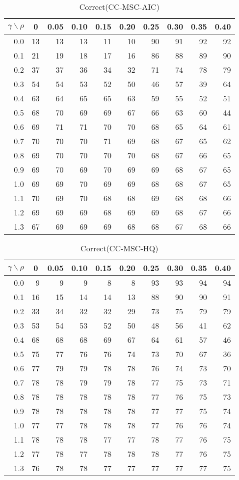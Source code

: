 \documentclass[12pt]{article}
\begin{document}
%
\begin{table}[!tbp]
\caption{Correct(CC-MSC-AIC)}
 \begin{center}
 \begin{tabular}{r|rrrrrrrrr}\hline\hline
\multicolumn{1}{c|}{$\gamma\backslash\rho$}&\multicolumn{1}{c}{0}&\multicolumn{1}{c}{0.05}&\multicolumn{1}{c}{0.10}&\multicolumn{1}{c}{0.15}&\multicolumn{1}{c}{0.20}&\multicolumn{1}{c}{0.25}&\multicolumn{1}{c}{0.30}&\multicolumn{1}{c}{0.35}&\multicolumn{1}{c}{0.40}\tabularnewline
\hline
0.0&13&13&13&11&10&90&91&92&92\tabularnewline
0.1&21&19&18&17&16&86&88&89&90\tabularnewline
0.2&37&37&36&34&32&71&74&78&79\tabularnewline
0.3&54&54&53&52&50&46&57&39&64\tabularnewline
0.4&63&64&65&65&63&59&55&52&51\tabularnewline
0.5&68&70&69&69&67&66&63&60&44\tabularnewline
0.6&69&71&71&70&70&68&65&64&61\tabularnewline
0.7&70&70&70&71&69&68&67&65&62\tabularnewline
0.8&69&70&70&70&70&68&67&66&65\tabularnewline
0.9&69&70&69&70&69&69&68&67&65\tabularnewline
1.0&69&69&70&69&69&68&68&67&65\tabularnewline
1.1&70&69&70&68&68&69&68&68&66\tabularnewline
1.2&69&69&69&68&69&69&68&67&66\tabularnewline
1.3&67&69&69&69&68&68&67&68&66\tabularnewline
\hline
\end{tabular}

\end{center}

\end{table}

%
\begin{table}[!tbp]
\caption{Correct(CC-MSC-HQ)}
 \begin{center}
 \begin{tabular}{r|rrrrrrrrr}\hline\hline
\multicolumn{1}{c|}{$\gamma\backslash\rho$}&\multicolumn{1}{c}{0}&\multicolumn{1}{c}{0.05}&\multicolumn{1}{c}{0.10}&\multicolumn{1}{c}{0.15}&\multicolumn{1}{c}{0.20}&\multicolumn{1}{c}{0.25}&\multicolumn{1}{c}{0.30}&\multicolumn{1}{c}{0.35}&\multicolumn{1}{c}{0.40}\tabularnewline
\hline
0.0& 9& 9& 9& 8& 8&93&93&94&94\tabularnewline
0.1&16&15&14&14&13&88&90&90&91\tabularnewline
0.2&33&34&32&32&29&73&75&79&79\tabularnewline
0.3&53&54&53&52&50&48&56&41&62\tabularnewline
0.4&68&68&68&69&67&64&61&57&46\tabularnewline
0.5&75&77&76&76&74&73&70&67&36\tabularnewline
0.6&77&79&79&78&78&76&74&73&70\tabularnewline
0.7&78&78&79&79&78&77&75&73&71\tabularnewline
0.8&78&78&78&78&78&77&76&75&73\tabularnewline
0.9&78&78&78&78&78&77&77&75&74\tabularnewline
1.0&77&77&78&78&78&77&76&76&74\tabularnewline
1.1&78&78&78&77&77&78&77&76&75\tabularnewline
1.2&77&78&77&78&78&78&77&76&75\tabularnewline
1.3&76&78&78&77&77&77&77&77&75\tabularnewline
\hline
\end{tabular}

\end{center}

\end{table}
\end{document}
